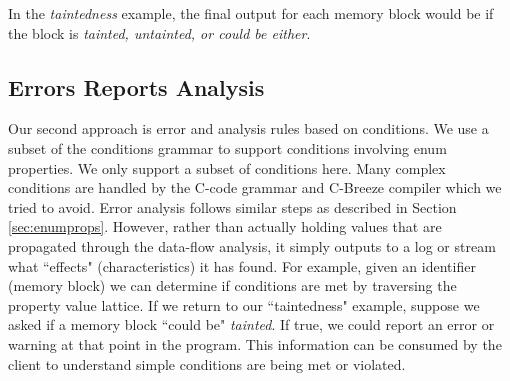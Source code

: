 In the \textit{taintedness} example, the final output for each memory block would be if the block is \textit{tainted, untainted, or could be either}.

\subsection{Errors Reports Analysis}
Our second approach is error and analysis rules based on conditions. We use a subset of the conditions grammar to support conditions involving enum properties. We only support a subset of conditions here. Many complex conditions are handled by the C-code grammar and C-Breeze compiler which we tried to avoid. Error analysis follows similar steps as described in Section \ref{sec:enumprops}. However, rather than actually holding values that are propagated through the data-flow analysis, it simply outputs to a log or stream what ``effects" (characteristics) it has found. For example, given an identifier (memory block) we can determine if conditions are met by traversing the property value lattice. If we return to our ``taintedness" example, suppose we asked if a memory block ``could be" \textit{tainted}. If true, we could report an error or warning at that point in the program. This information can be consumed by the client to understand simple conditions are being met or violated.
 
